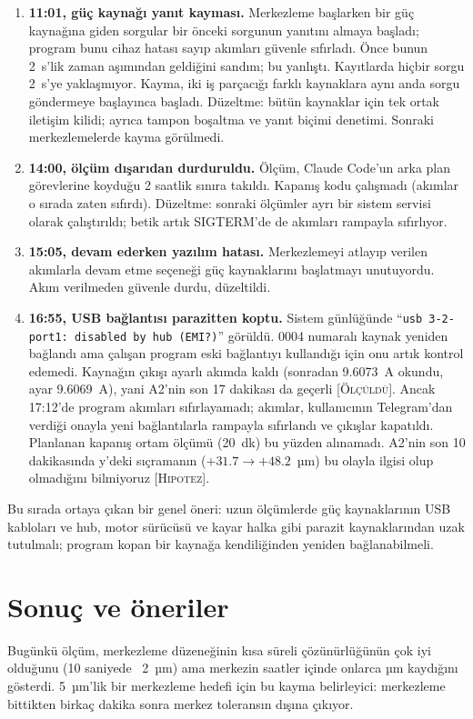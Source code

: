 \documentclass[11pt,a4paper]{article}
\newcommand{\kod}[1]{\texttt{#1}}
\newcommand{\olc}{\textsc{[Ölçüldü]}}
\newcommand{\hip}{\textsc{[Hipotez]}}
\begin{document}
\begin{enumerate}
\item \textbf{11:01, güç kaynağı yanıt kayması.} Merkezleme başlarken bir güç kaynağına giden sorgular
bir önceki sorgunun yanıtını almaya başladı; program bunu cihaz hatası sayıp akımları güvenle sıfırladı.
Önce bunun 2~s'lik zaman aşımından geldiğini sandım; bu yanlıştı. Kayıtlarda hiçbir sorgu 2~s'ye
yaklaşmıyor. Kayma, iki iş parçacığı farklı kaynaklara aynı anda sorgu göndermeye başlayınca başladı.
Düzeltme: bütün kaynaklar için tek ortak iletişim kilidi; ayrıca tampon boşaltma ve yanıt biçimi denetimi.
Sonraki merkezlemelerde kayma görülmedi.
\item \textbf{14:00, ölçüm dışarıdan durduruldu.} Ölçüm, Claude Code'un arka plan görevlerine koyduğu 2 saatlik
sınıra takıldı. Kapanış kodu çalışmadı (akımlar o sırada zaten sıfırdı). Düzeltme: sonraki ölçümler ayrı bir
sistem servisi olarak çalıştırıldı; betik artık SIGTERM'de de akımları rampayla sıfırlıyor.
\item \textbf{15:05, devam ederken yazılım hatası.} Merkezlemeyi atlayıp verilen akımlarla devam etme
seçeneği güç kaynaklarını başlatmayı unutuyordu. Akım verilmeden güvenle durdu, düzeltildi.
\item \textbf{16:55, USB bağlantısı parazitten koptu.} Sistem günlüğünde ``\kod{usb 3-2-port1: disabled by hub
(EMI?)}'' görüldü. 0004 numaralı kaynak yeniden bağlandı ama çalışan program eski bağlantıyı kullandığı için
onu artık kontrol edemedi. Kaynağın çıkışı ayarlı akımda kaldı (sonradan 9.6073~A okundu, ayar 9.6069~A), yani
A2'nin son 17 dakikası da geçerli \olc. Ancak 17:12'de program akımları sıfırlayamadı; akımlar, kullanıcının
Telegram'dan verdiği onayla yeni bağlantılarla rampayla sıfırlandı ve çıkışlar kapatıldı. Planlanan kapanış
ortam ölçümü (20~dk) bu yüzden alınamadı. A2'nin son 10 dakikasında y'deki sıçramanın ($+31.7 \rightarrow
+48.2$~µm) bu olayla ilgisi olup olmadığını bilmiyoruz \hip.
\end{enumerate}

Bu sırada ortaya çıkan bir genel öneri: uzun ölçümlerde güç kaynaklarının USB kabloları ve hub, motor
sürücüsü ve kayar halka gibi parazit kaynaklarından uzak tutulmalı; program kopan bir kaynağa
kendiliğinden yeniden bağlanabilmeli.

\section{Sonuç ve öneriler}

Bugünkü ölçüm, merkezleme düzeneğinin kısa süreli çözünürlüğünün çok iyi olduğunu (10 saniyede ~2~µm)
ama merkezin saatler içinde onlarca µm kaydığını gösterdi. 5~µm'lik bir merkezleme hedefi için bu kayma
belirleyici: merkezleme bittikten birkaç dakika sonra merkez toleransın dışına çıkıyor.
\end{document}
